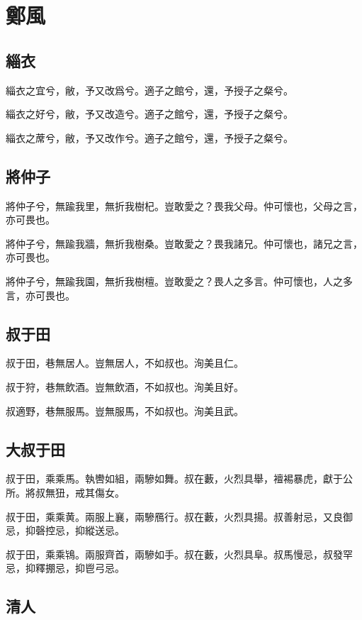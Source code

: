 \section[鄭風]{鄭風}

\subsection[緇衣]{緇衣}

緇衣之宜兮，敝，予又改爲兮。適子之館兮，還，予授子之粲兮。

緇衣之好兮，敝，予又改造兮。適子之館兮，還，予授子之粲兮。

緇衣之蓆兮，敝，予又改作兮。適子之館兮，還，予授子之粲兮。

\subsection[將仲子]{將仲子}

將仲子兮，無踰我里，無折我樹杞。豈敢愛之？畏我父母。仲可懷也，父母之言，亦可畏也。

將仲子兮，無踰我牆，無折我樹桑。豈敢愛之？畏我諸兄。仲可懷也，諸兄之言，亦可畏也。

將仲子兮，無踰我園，無折我樹檀。豈敢愛之？畏人之多言。仲可懷也，人之多言，亦可畏也。

\subsection[叔于田]{叔于田}

叔于田，巷無居人。豈無居人，不如叔也。洵美且仁。

叔于狩，巷無飲酒。豈無飲酒，不如叔也。洵美且好。

叔適野，巷無服馬。豈無服馬，不如叔也。洵美且武。

\subsection[大叔于田]{大叔于田}

叔于田，乘乘馬。執轡如組，兩驂如舞。叔在藪，火烈具舉，襢裼暴虎，獻于公所。將叔無狃，戒其傷女。

叔于田，乘乘黄。兩服上襄，兩驂鴈行。叔在藪，火烈具揚。叔善射忌，又良御忌，抑磬控忌，抑縱送忌。

叔于田，乘乘鴇。兩服齊首，兩驂如手。叔在藪，火烈具阜。叔馬慢忌，叔發罕忌，抑釋掤忌，抑鬯弓忌。

\subsection[清人]{清人}

